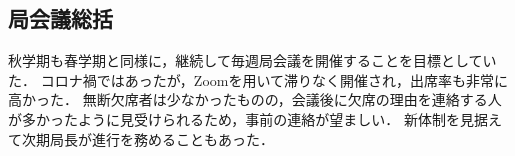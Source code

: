 \subsection*{局会議総括}


秋学期も春学期と同様に，継続して毎週局会議を開催することを目標としていた．
コロナ禍ではあったが，Zoomを用いて滞りなく開催され，出席率も非常に高かった．
無断欠席者は少なかったものの，会議後に欠席の理由を連絡する人が多かったように見受けられるため，事前の連絡が望ましい．
新体制を見据えて次期局長が進行を務めることもあった．

